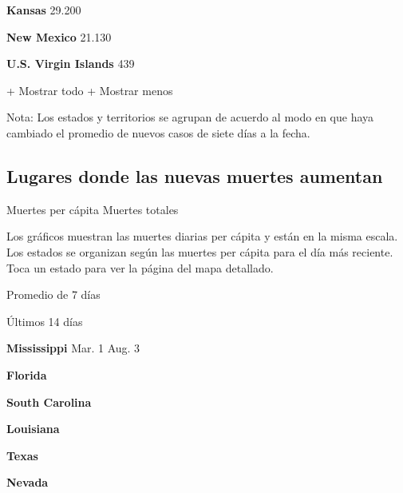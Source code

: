 \textbf{Kansas} 29.200

\href{https://www.nytimes.com/interactive/2020/us/new-mexico-coronavirus-cases.html}{}

\textbf{New Mexico} 21.130

\textbf{U.S. Virgin Islands} 439

+ Mostrar todo + Mostrar menos

Nota: Los estados y territorios se agrupan de acuerdo al modo en que
haya cambiado el promedio de nuevos casos de siete días a la fecha.

\hypertarget{lugares-donde-las-nuevas-muertes-aumentan}{%
\subsection{Lugares donde las nuevas muertes
aumentan}\label{lugares-donde-las-nuevas-muertes-aumentan}}

Muertes per cápita Muertes totales

Los gráficos muestran las muertes diarias per cápita y están en la misma
escala. Los estados se organizan según las muertes per cápita para el
día más reciente. Toca un estado para ver la página del mapa detallado.

\href{https://www.nytimes.com/interactive/2020/us/mississippi-coronavirus-cases.html}{}

Promedio de 7 días

Últimos 14 días

\textbf{Mississippi} Mar. 1 Aug. 3

\href{https://www.nytimes.com/interactive/2020/us/florida-coronavirus-cases.html}{}

\textbf{Florida}

\href{https://www.nytimes.com/interactive/2020/us/south-carolina-coronavirus-cases.html}{}

\textbf{South Carolina}

\href{https://www.nytimes.com/interactive/2020/us/louisiana-coronavirus-cases.html}{}

\textbf{Louisiana}

\href{https://www.nytimes.com/interactive/2020/us/texas-coronavirus-cases.html}{}

\textbf{Texas}

\href{https://www.nytimes.com/interactive/2020/us/nevada-coronavirus-cases.html}{}

\textbf{Nevada}

\href{https://www.nytimes.com/interactive/2020/us/georgia-coronavirus-cases.html}{}

